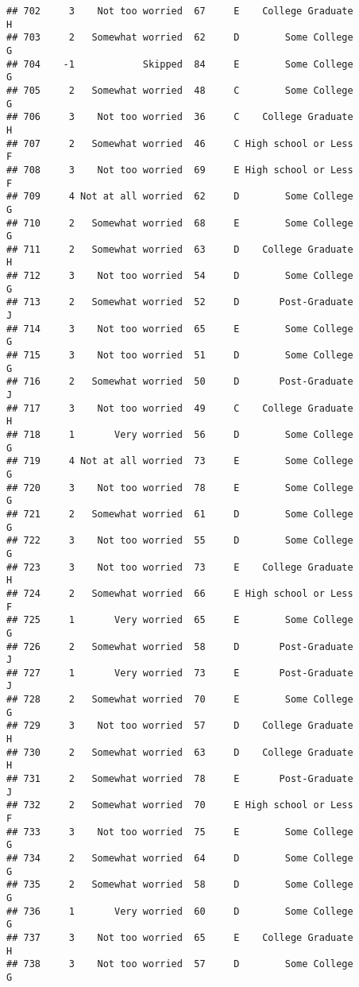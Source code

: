\documentclass[
]{article}
\begin{document}
\begin{verbatim}
## 702     3    Not too worried  67     E    College Graduate         H
## 703     2   Somewhat worried  62     D        Some College         G
## 704    -1            Skipped  84     E        Some College         G
## 705     2   Somewhat worried  48     C        Some College         G
## 706     3    Not too worried  36     C    College Graduate         H
## 707     2   Somewhat worried  46     C High school or Less         F
## 708     3    Not too worried  69     E High school or Less         F
## 709     4 Not at all worried  62     D        Some College         G
## 710     2   Somewhat worried  68     E        Some College         G
## 711     2   Somewhat worried  63     D    College Graduate         H
## 712     3    Not too worried  54     D        Some College         G
## 713     2   Somewhat worried  52     D       Post-Graduate         J
## 714     3    Not too worried  65     E        Some College         G
## 715     3    Not too worried  51     D        Some College         G
## 716     2   Somewhat worried  50     D       Post-Graduate         J
## 717     3    Not too worried  49     C    College Graduate         H
## 718     1       Very worried  56     D        Some College         G
## 719     4 Not at all worried  73     E        Some College         G
## 720     3    Not too worried  78     E        Some College         G
## 721     2   Somewhat worried  61     D        Some College         G
## 722     3    Not too worried  55     D        Some College         G
## 723     3    Not too worried  73     E    College Graduate         H
## 724     2   Somewhat worried  66     E High school or Less         F
## 725     1       Very worried  65     E        Some College         G
## 726     2   Somewhat worried  58     D       Post-Graduate         J
## 727     1       Very worried  73     E       Post-Graduate         J
## 728     2   Somewhat worried  70     E        Some College         G
## 729     3    Not too worried  57     D    College Graduate         H
## 730     2   Somewhat worried  63     D    College Graduate         H
## 731     2   Somewhat worried  78     E       Post-Graduate         J
## 732     2   Somewhat worried  70     E High school or Less         F
## 733     3    Not too worried  75     E        Some College         G
## 734     2   Somewhat worried  64     D        Some College         G
## 735     2   Somewhat worried  58     D        Some College         G
## 736     1       Very worried  60     D        Some College         G
## 737     3    Not too worried  65     E    College Graduate         H
## 738     3    Not too worried  57     D        Some College         G

\end{verbatim}
\end{document}
